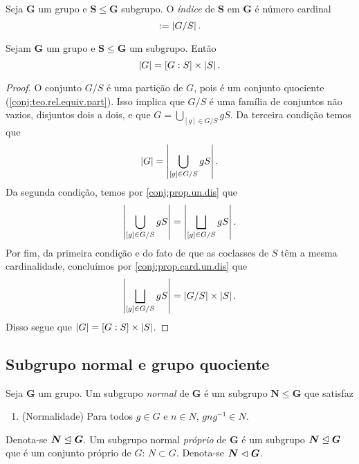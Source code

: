 \begin{definition}
Seja $\bm G$ um grupo e $\bm S \leq \bm G$ subgrupo. O \emph{índice} de $\bm S$ em $\bm G$ é número cardinal
	\begin{equation*}
	[G : S] := \card{G/S}.
	\end{equation*}
\end{definition}

\begin{proposition}
Sejam $\bm G$ um grupo e $\bm S \leq \bm G$ um subgrupo. Então
	\begin{equation*}
	\left\lvert{G}\right\rvert=[G:S] \times \left\lvert{S}\right\rvert.
	\end{equation*}
\end{proposition}
\begin{proof}
O conjunto $G/S$ é uma partição de $G$, pois é um conjunto quociente (\ref{conj:teo.rel.equiv.part}). Isso implica que $G/S$ é uma família de conjuntos não vazios, disjuntos dois a dois, e que $G = \bigcup_{[g] \in G/S} gS$. Da terceira condição temos que
	\begin{equation*}
	\left\lvert{G}\right\rvert = \left\lvert{\bigcup_{[g] \in G/S} gS}\right\rvert.
	\end{equation*}
Da segunda condição, temos por \ref{conj:prop.un.dis} que
	\begin{equation*}
	\left\lvert{\bigcup_{[g] \in G/S} gS}\right\rvert = \left\lvert{\bigsqcup_{[g] \in G/S} gS}\right\rvert.
	\end{equation*}
Por fim, da primeira condição e do fato de que as coclasses de $S$ têm a mesma cardinalidade, concluímos por \ref{conj:prop.card.un.dis} que
	\begin{equation*}
	\left\lvert{\bigsqcup_{[g] \in G/S} gS}\right\rvert = \left\lvert{G/S}\right\rvert \times \left\lvert{S}\right\rvert.
	\end{equation*}
Disso segue que $\left\lvert{G}\right\rvert=[G:S] \times \left\lvert{S}\right\rvert$.
\end{proof}

\subsection{Subgrupo normal e grupo quociente}

\begin{definition}
Seja $\bm G$ um grupo. Um subgrupo \emph{normal} de $\bm G$ é um subgrupo $\bm N \leq \bm G$ que satisfaz
	\begin{enumerate}[label={SGN\arabic*.}]
	\item \label{SGN} (Normalidade) Para todos $g \in G$ e $n \in N$, $gng^{-1} \in N$.
	\end{enumerate}
\noindent
Denota-se $\bm N \mathrel{\unlhd} \bm G$. Um subgrupo normal \emph{próprio} de $\bm G$ é um subgrupo $\bm N \mathrel{\unlhd} \bm G$ que é um conjunto próprio de $G$: $N \subset G$. Denota-se $\bm N \mathrel{\lhd} \bm G$.
\end{definition}

